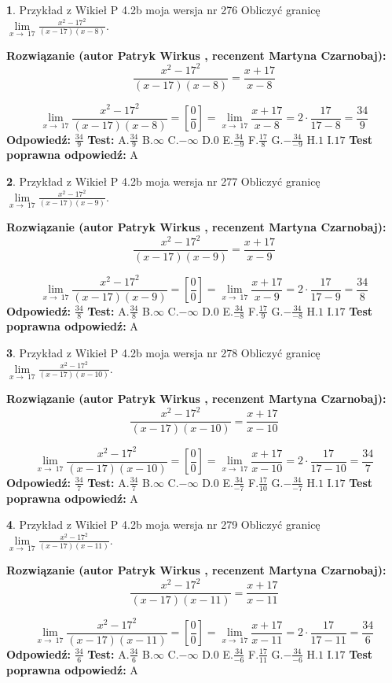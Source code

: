 \documentclass[12pt, a4paper]{article}
\theoremstyle{definition} %
\newtheorem{zad}{}
\newcommand{\zadStart}[1]{\begin{zad}#1\newline}
\newcommand{\zadStop}{\end{zad}}
\newcommand{\rozwStart}[2]{\noindent \textbf{Rozwiązanie (autor #1 , recenzent #2): }\newline}
\newcommand{\rozwStop}{\newline}
\newcommand{\odpStart}{\noindent \textbf{Odpowiedź:}\newline}
\newcommand{\odpStop}{\newline}
\newcommand{\testStart}{\noindent \textbf{Test:}\newline}
\newcommand{\testStop}{\newline}
\newcommand{\kluczStart}{\noindent \textbf{Test poprawna odpowiedź:}\newline}
\newcommand{\kluczStop}{\newline}
\begin{document}
\zadStart{Przykład z Wikieł P 4.2b moja wersja nr 276}
Obliczyć granicę $\lim\limits_{x\to\ 17}\frac{x^{2}-17^{2}}{(x-17)(x-8)}$.
\zadStop
\rozwStart{Patryk Wirkus}{Martyna Czarnobaj}
$$\frac{x^{2}-17^{2}}{(x-17)(x-8)}=\frac{x+17}{x-8}$$

$$\lim\limits_{x\to\ 17}\frac{x^{2}-17^{2}}{(x-17)(x-8)}=[\frac{0}{0}]=\lim\limits_{x\to\ 17}\frac{x+17}{x-8}=2 \cdot \frac{17}{17-8} = \frac{34}{9}$$
\rozwStop
\odpStart
$\frac{34}{9}$
\odpStop
\testStart
A.$\frac{34}{9}$
B.$\infty$
C.$-\infty$
D.$0$
E.$\frac{34}{-9}$
F.$\frac{17}{8}$
G.$-\frac{34}{-9}$
H.$1$
I.$17$
\testStop
\kluczStart
A
\kluczStop



\zadStart{Przykład z Wikieł P 4.2b moja wersja nr 277}
Obliczyć granicę $\lim\limits_{x\to\ 17}\frac{x^{2}-17^{2}}{(x-17)(x-9)}$.
\zadStop
\rozwStart{Patryk Wirkus}{Martyna Czarnobaj}
$$\frac{x^{2}-17^{2}}{(x-17)(x-9)}=\frac{x+17}{x-9}$$

$$\lim\limits_{x\to\ 17}\frac{x^{2}-17^{2}}{(x-17)(x-9)}=[\frac{0}{0}]=\lim\limits_{x\to\ 17}\frac{x+17}{x-9}=2 \cdot \frac{17}{17-9} = \frac{34}{8}$$
\rozwStop
\odpStart
$\frac{34}{8}$
\odpStop
\testStart
A.$\frac{34}{8}$
B.$\infty$
C.$-\infty$
D.$0$
E.$\frac{34}{-8}$
F.$\frac{17}{9}$
G.$-\frac{34}{-8}$
H.$1$
I.$17$
\testStop
\kluczStart
A
\kluczStop



\zadStart{Przykład z Wikieł P 4.2b moja wersja nr 278}
Obliczyć granicę $\lim\limits_{x\to\ 17}\frac{x^{2}-17^{2}}{(x-17)(x-10)}$.
\zadStop
\rozwStart{Patryk Wirkus}{Martyna Czarnobaj}
$$\frac{x^{2}-17^{2}}{(x-17)(x-10)}=\frac{x+17}{x-10}$$

$$\lim\limits_{x\to\ 17}\frac{x^{2}-17^{2}}{(x-17)(x-10)}=[\frac{0}{0}]=\lim\limits_{x\to\ 17}\frac{x+17}{x-10}=2 \cdot \frac{17}{17-10} = \frac{34}{7}$$
\rozwStop
\odpStart
$\frac{34}{7}$
\odpStop
\testStart
A.$\frac{34}{7}$
B.$\infty$
C.$-\infty$
D.$0$
E.$\frac{34}{-7}$
F.$\frac{17}{10}$
G.$-\frac{34}{-7}$
H.$1$
I.$17$
\testStop
\kluczStart
A
\kluczStop



\zadStart{Przykład z Wikieł P 4.2b moja wersja nr 279}
Obliczyć granicę $\lim\limits_{x\to\ 17}\frac{x^{2}-17^{2}}{(x-17)(x-11)}$.
\zadStop
\rozwStart{Patryk Wirkus}{Martyna Czarnobaj}
$$\frac{x^{2}-17^{2}}{(x-17)(x-11)}=\frac{x+17}{x-11}$$

$$\lim\limits_{x\to\ 17}\frac{x^{2}-17^{2}}{(x-17)(x-11)}=[\frac{0}{0}]=\lim\limits_{x\to\ 17}\frac{x+17}{x-11}=2 \cdot \frac{17}{17-11} = \frac{34}{6}$$
\rozwStop
\odpStart
$\frac{34}{6}$
\odpStop
\testStart
A.$\frac{34}{6}$
B.$\infty$
C.$-\infty$
D.$0$
E.$\frac{34}{-6}$
F.$\frac{17}{11}$
G.$-\frac{34}{-6}$
H.$1$
I.$17$
\testStop
\kluczStart
A
\kluczStop
\end{document}
